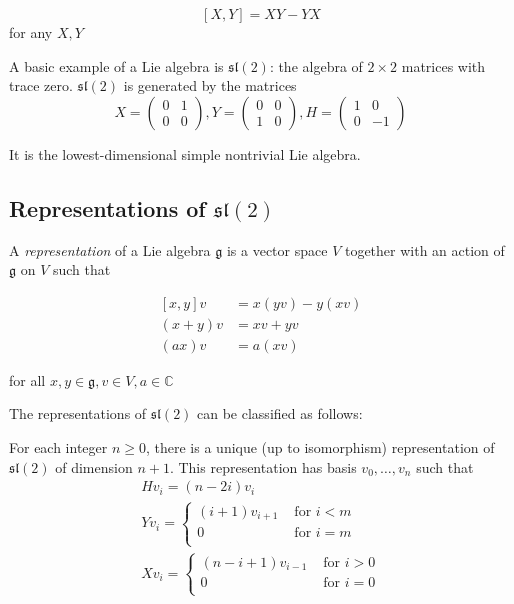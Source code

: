 \documentclass[]{article}
\numberwithin{equation}{subsection}
\begin{document}
\[ \left[ X,Y \right] = XY - YX\] 
for any $X,Y$

A basic example of a Lie algebra is $\mathfrak{sl}(2)$: the algebra of $2 \times 2$ matrices with trace zero. $\mathfrak{sl}(2)$ is generated by the matrices 
\begin{equation}
    X = \begin{pmatrix} 0 & 1 \\ 0 & 0 \end{pmatrix},
    Y = \begin{pmatrix} 0 & 0 \\ 1 & 0 \end{pmatrix}, 
    H = \begin{pmatrix} 1 & 0 \\ 0 &-1 \end{pmatrix}
\end{equation}

It is the lowest-dimensional simple nontrivial Lie algebra. 

\subsection{Representations of $\mathfrak{sl}(2)$}

A \emph{representation} of a Lie algebra $\mathfrak{g}$ is a vector space $V$ together with an action of $\mathfrak{g}$ on $V$ such that 

\begin{align*}
    \left[ x,y \right] v &= x(yv) - y(xv) \\
    (x+y)v &= xv + yv \\
    (ax)v &= a(xv)
\end{align*}

for all $x,y \in \mathfrak{g}, v \in V, a \in \mathbb{C}$

The representations of $\mathfrak{sl}(2)$ can be classified as follows: 

For each integer $n \geq 0$, there is a unique (up to isomorphism) representation of $\mathfrak{sl}(2)$ of dimension $n+1$. This representation has basis $v_0, \ldots, v_{n}$ such that
\begin{align*}
    &H v_i = (n - 2i) v_i& \\
    &Y v_i = \begin{cases} 
                (i+1)v_{i+1}& \text{ for $i < m$} \\
                0& \text{ for $i = m$} \\
            \end{cases} \\
    &X v_i = \begin{cases} 
                (n-i+1)v_{i-1}& \text{ for $i > 0$} \\
                0& \text{ for $i = 0$} \\
            \end{cases}
\end{align*}
\end{document}
